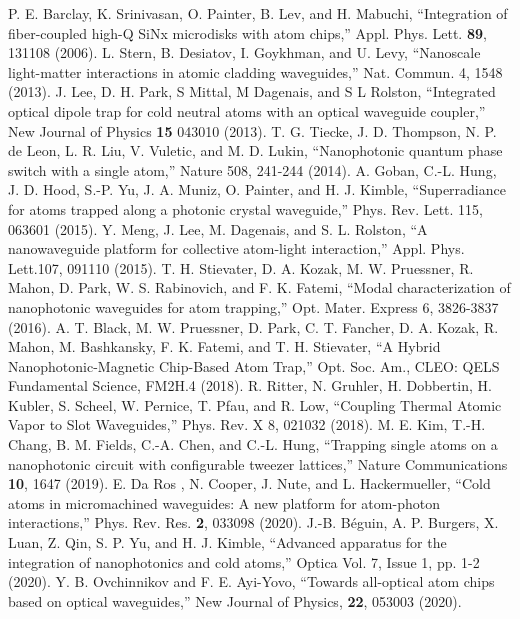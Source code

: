 \documentclass{osa-article}
\begin{document}
\begin{thebibliography}{99}
  P. E. Barclay, K. Srinivasan, O. Painter, B. Lev, and H. Mabuchi, {} ``Integration of fiber-coupled high-Q SiNx microdisks with atom chips,'' Appl. Phys. Lett. \textbf{89}, 131108 (2006).
 L. Stern, B. Desiatov, I. Goykhman, and U. Levy, ``Nanoscale light-matter interactions in atomic cladding waveguides,'' Nat. Commun. 4,  1548 (2013).
 J. Lee, D. H. Park, S Mittal, M Dagenais, and S L Rolston, ``Integrated optical dipole trap for cold neutral atoms with an optical waveguide coupler,'' New Journal of Physics \textbf{15} 043010 (2013).
 T. G. Tiecke, J. D. Thompson, N. P. de Leon, L. R. Liu, V. Vuletic, and M. D. Lukin, ``Nanophotonic quantum phase switch with a single atom,'' Nature 508, 241-244 (2014).
 A. Goban, C.-L. Hung, J. D. Hood, S.-P. Yu, J. A. Muniz, O. Painter, and H. J. Kimble, ``Superradiance for atoms trapped along a photonic crystal waveguide,'' Phys. Rev. Lett. 115, 063601 (2015).
 Y. Meng, J. Lee, M. Dagenais, and S. L. Rolston, ``A nanowaveguide platform for collective atom-light interaction,'' Appl. Phys. Lett.107, 091110 (2015).
 T. H. Stievater, D. A. Kozak, M. W. Pruessner, R. Mahon, D. Park, W. S. Rabinovich, and F. K. Fatemi, ``Modal characterization of nanophotonic waveguides for atom trapping,'' Opt. Mater. Express 6, 3826-3837 (2016).
 A. T. Black, M. W. Pruessner, D. Park, C. T. Fancher, D. A. Kozak, R. Mahon, M. Bashkansky, F. K. Fatemi, and T. H. Stievater, ``A Hybrid Nanophotonic-Magnetic Chip-Based Atom Trap,'' Opt. Soc. Am., CLEO: QELS Fundamental Science, FM2H.4 (2018).
 R. Ritter, N. Gruhler, H. Dobbertin, H. Kubler, S. Scheel, W. Pernice, T. Pfau, and R. Low, ``Coupling Thermal Atomic Vapor to Slot Waveguides,'' Phys. Rev. X 8, 021032 (2018).
 M. E. Kim, T.-H. Chang, B. M. Fields, C.-A. Chen, and C.-L. Hung, ``Trapping single atoms on a nanophotonic circuit with configurable tweezer lattices,'' Nature Communications \textbf{10}, 1647 (2019).
 E. Da Ros , N. Cooper, J. Nute, and L. Hackermueller, ``Cold atoms in micromachined waveguides: A new platform for atom-photon interactions,'' Phys. Rev. Res. \textbf{2}, 033098 (2020).
 J.-B. B{\'e}guin, A. P. Burgers, X. Luan, Z. Qin, S. P. Yu, and H. J. Kimble, ``Advanced apparatus for the integration of nanophotonics and cold atoms,'' Optica Vol. 7, Issue 1, pp. 1-2 (2020).
 Y. B. Ovchinnikov and F. E. Ayi-Yovo, ``Towards all-optical atom chips based on optical waveguides,'' New Journal of Physics, \textbf{22}, 053003 (2020).


\end{thebibliography}
\end{document}
